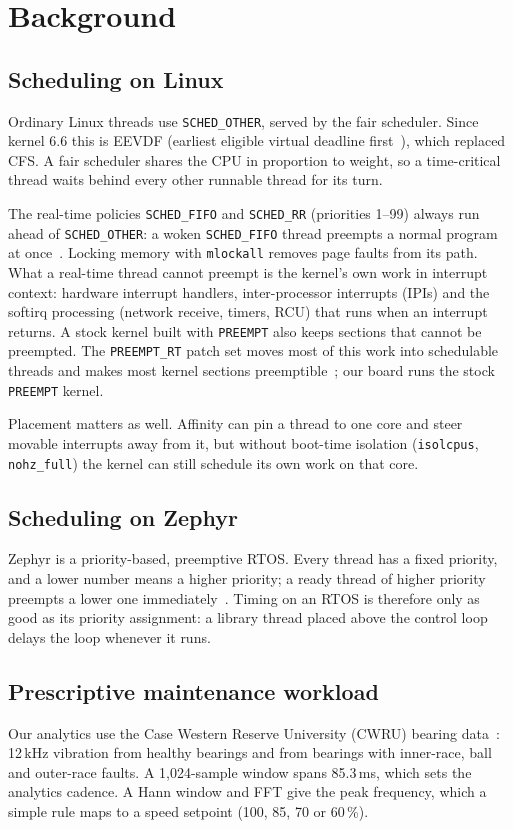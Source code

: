 \section{Background}
\label{sec:background}

\subsection{Scheduling on Linux}
Ordinary Linux threads use \texttt{SCHED\_OTHER}, served by the fair scheduler. Since kernel 6.6 this is EEVDF (earliest eligible virtual deadline first~\cite{stoica1995eevdf,linux_sched_eevdf}), which replaced CFS. A fair scheduler shares the CPU in proportion to weight, so a time-critical thread waits behind every other runnable thread for its turn.

The real-time policies \texttt{SCHED\_FIFO} and \texttt{SCHED\_RR} (priorities 1--99) always run ahead of \texttt{SCHED\_OTHER}: a woken \texttt{SCHED\_FIFO} thread preempts a normal program at once~\cite{linux_sched_rt}. Locking memory with \texttt{mlockall} removes page faults from its path. What a real-time thread cannot preempt is the kernel's own work in interrupt context: hardware interrupt handlers, inter-processor interrupts (IPIs) and the softirq processing (network receive, timers, RCU) that runs when an interrupt returns. A stock kernel built with \texttt{PREEMPT} also keeps sections that cannot be preempted. The \texttt{PREEMPT\_RT} patch set moves most of this work into schedulable threads and makes most kernel sections preemptible~\cite{reghenzani2019rtlinux}; our board runs the stock \texttt{PREEMPT} kernel.

Placement matters as well. Affinity can pin a thread to one core and steer movable interrupts away from it, but without boot-time isolation (\texttt{isolcpus}, \texttt{nohz\_full}) the kernel can still schedule its own work on that core.

\subsection{Scheduling on Zephyr}
Zephyr is a priority-based, preemptive RTOS. Every thread has a fixed priority, and a lower number means a higher priority; a ready thread of higher priority preempts a lower one immediately~\cite{zephyr_threads}. Timing on an RTOS is therefore only as good as its priority assignment: a library thread placed above the control loop delays the loop whenever it runs.

\subsection{Prescriptive maintenance workload}
Our analytics use the Case Western Reserve University (CWRU) bearing data~\cite{cwru_data,smith2015cwru}: 12\,kHz vibration from healthy bearings and from bearings with inner-race, ball and outer-race faults. A 1{,}024-sample window spans 85.3\,ms, which sets the analytics cadence. A Hann window and FFT give the peak frequency, which a simple rule maps to a speed setpoint (100, 85, 70 or 60\,\%).
